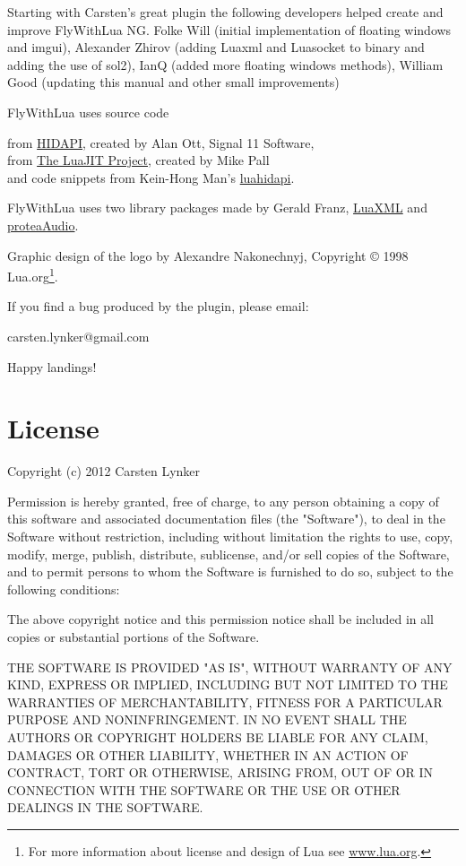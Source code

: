 \documentclass[11pt,parskip=half,a4paper]{scrartcl}
\begin{document}
Starting with Carsten's great plugin the following developers helped create and improve FlyWithLua NG. Folke Will (initial implementation of floating windows and imgui), Alexander Zhirov (adding Luaxml and Luasocket to binary and adding the use of sol2), IanQ (added more floating windows methods), William Good (updating this manual and other small improvements) 

FlyWithLua uses source code

from \href{http://www.signal11.us/oss/hidapi/}{HIDAPI}, created by Alan Ott, Signal 11 Software,\\
from \href{http://luajit.org/}{The LuaJIT Project}, created by Mike Pall\\
and code snippets from Kein-Hong Man's \href{https://sites.google.com/site/rubblepiles/hardware-stuff}{luahidapi}.

FlyWithLua uses two library packages made by Gerald Franz, \href{http://viremo.eludi.net/LuaXML/index.html}{LuaXML} and \href{http://viremo.eludi.net/proteaAudio/proteaaudiolua.html}{proteaAudio}.

Graphic design of the logo by Alexandre Nakonechnyj, Copyright © 1998 Lua.org\footnote{For more information about license and design of Lua see \url{www.lua.org}.}.

If you find a bug produced by the plugin, please email:

carsten.lynker@gmail.com

Happy landings!

\newpage
\section{License}

Copyright (c) 2012 Carsten Lynker

Permission is hereby granted, free of charge, to any person obtaining a copy of this software and associated documentation files (the "Software"), to deal in the Software without restriction, including without limitation the rights to use, copy, modify, merge, publish, distribute, sublicense, and/or sell copies of the Software, and to permit persons to whom the Software is furnished to do so, subject to the following conditions:

The above copyright notice and this permission notice shall be included in all copies or substantial portions of the Software.

THE SOFTWARE IS PROVIDED "AS IS", WITHOUT WARRANTY OF ANY KIND, EXPRESS OR IMPLIED, INCLUDING BUT NOT LIMITED TO THE WARRANTIES OF MERCHANTABILITY, FITNESS FOR A PARTICULAR PURPOSE AND NONINFRINGEMENT. IN NO EVENT SHALL THE AUTHORS OR COPYRIGHT HOLDERS BE LIABLE FOR ANY CLAIM, DAMAGES OR OTHER LIABILITY, WHETHER IN AN ACTION OF CONTRACT, TORT OR OTHERWISE, ARISING FROM, OUT OF OR IN CONNECTION WITH THE SOFTWARE OR THE USE OR OTHER DEALINGS IN THE SOFTWARE.
\end{document}
